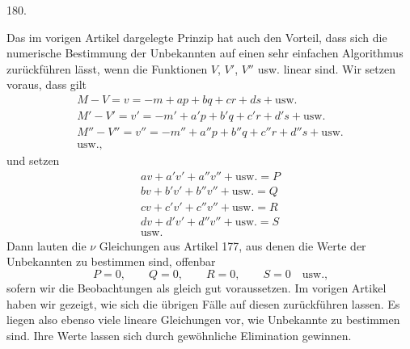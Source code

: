 \begin{center}\hypertarget{native-252-article180}{}180.\end{center}
Das im vorigen Artikel dargelegte Prinzip hat auch den Vorteil, dass sich die numerische Bestimmung der Unbekannten auf einen sehr einfachen Algorithmus zurückführen lässt, wenn die Funktionen $V$, $V'$, $V''$ usw. linear sind. Wir setzen voraus, dass gilt
\[
\begin{gathered}
M-V=v=-m+ap+bq+cr+ds+\text{usw.}\\
M'-V'=v'=-m'+a'p+b'q+c'r+d's+\text{usw.}\\
M''-V''=v''=-m''+a''p+b''q+c''r+d''s+\text{usw.}\\
\text{usw.,}
\end{gathered}
\]
und setzen
\[
\begin{gathered}
av+a'v'+a''v''+\text{usw.}=P\\
bv+b'v'+b''v''+\text{usw.}=Q\\
cv+c'v'+c''v''+\text{usw.}=R\\
dv+d'v'+d''v''+\text{usw.}=S\\
\text{usw.}
\end{gathered}
\]
Dann lauten die $\nu$ Gleichungen aus Artikel 177, aus denen die Werte der Unbekannten zu bestimmen sind, offenbar
\[
P=0,\qquad Q=0,\qquad R=0,\qquad S=0\quad\text{usw.,}
\]
sofern wir die Beobachtungen als gleich gut voraussetzen. Im vorigen Artikel haben wir gezeigt, wie sich die übrigen Fälle auf diesen zurückführen lassen. Es liegen also ebenso viele lineare Gleichungen vor, wie Unbekannte zu bestimmen sind. Ihre Werte lassen sich durch gewöhnliche Elimination gewinnen.

